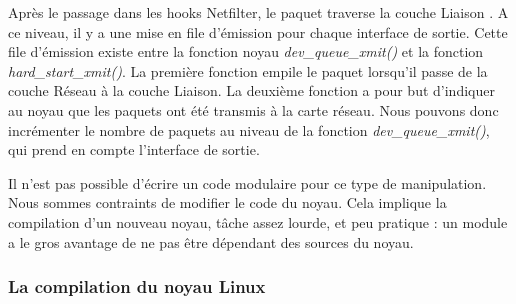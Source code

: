 \documentclass[a4paper]{article}
\begin{document}
Après le passage dans les hooks Netfilter, le paquet traverse la couche Liaison \cite{intel} \cite{stack}. A ce niveau, il y a une mise en file d’émission pour chaque interface de sortie. Cette file d’émission existe entre la fonction noyau \textit{dev\_queue\_xmit()} et la fonction \textit{hard\_start\_xmit()}. La première fonction empile le paquet lorsqu’il passe de la couche Réseau à la couche Liaison. La deuxième fonction a pour but d’indiquer au noyau que les paquets ont été transmis à la carte réseau. Nous pouvons donc incrémenter le nombre de paquets au niveau de la fonction \textit{dev\_queue\_xmit()}, qui prend en compte l’interface de sortie.

Il n’est pas possible d’écrire un code modulaire pour ce type de manipulation.
Nous sommes contraints de modifier le code du noyau. Cela implique la compilation
d'un nouveau noyau, tâche assez lourde, et peu pratique : un module a le gros
avantage de ne pas être dépendant des sources du noyau.

\subsubsection{La compilation du noyau Linux}
\end{document}
